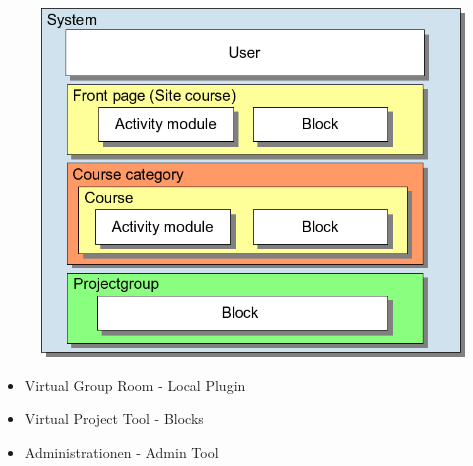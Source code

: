 \begin{frame}{\implementaras} 
\begin{figure}
\includegraphics[width=\columnwidth]{input/rasmus/Moodle-contexts-mymoodle.png}
\end{figure}
\end{frame}

\begin{frame}{\implementaras} 
\begin{itemize}
\item Virtual Group Room - Local Plugin
\item Virtual Project Tool - Blocks
\item Administrationen - Admin Tool


\end{itemize}
\end{frame}

